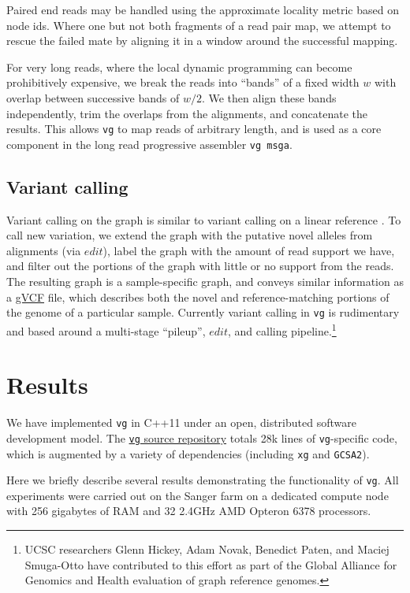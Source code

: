 \documentclass[12pt]{article}
\begin{document}
Paired end reads may be handled using the approximate locality metric based on node ids.
Where one but not both fragments of a read pair map, we attempt to rescue the failed mate by aligning it in a window around the successful mapping.

For very long reads, where the local dynamic programming can become prohibitively expensive, we break the reads into ``bands'' of a fixed width $w$ with overlap between successive bands of $w/2$.
We then align these bands independently, trim the overlaps from the alignments, and concatenate the results.
This allows {\tt vg} to map reads of arbitrary length, and is used as a core component in the long read progressive assembler {\tt vg msga}.

\subsection{Variant calling}

Variant calling on the graph is similar to variant calling on a linear reference \cite{samtools, garrison2012haplotype}.
To call new variation, we extend the graph with the putative novel alleles from alignments (via $edit$), label the graph with the amount of read support we have, and filter out the portions of the graph with little or no support from the reads.
The resulting graph is a sample-specific graph, and conveys similar information as a \href{http://samtools.github.io/hts-specs/VCFv4.2.pdf}{gVCF} file, which describes both the novel and reference-matching portions of the genome of a particular sample.
Currently variant calling in {\tt vg} is rudimentary and based around a multi-stage ``pileup'', $edit$, and calling pipeline.\footnote{UCSC researchers Glenn Hickey, Adam Novak, Benedict Paten, and Maciej Smuga-Otto have contributed to this effort as part of the Global Alliance for Genomics and Health evaluation of graph reference genomes.}

\section{Results}

We have implemented {\tt vg} in C++11 under an open, distributed software development model.
The \href{https://github.com/vgteam/vg}{{\tt vg} source repository} totals 28k lines of {\tt vg}-specific code, which is augmented by a variety of dependencies (including {\tt xg} and {\tt GCSA2}).

Here we briefly describe several results demonstrating the functionality of {\tt vg}.
All experiments were carried out on the Sanger farm on a dedicated compute node with 256 gigabytes of RAM and 32 2.4GHz AMD Opteron 6378 processors.
\end{document}
